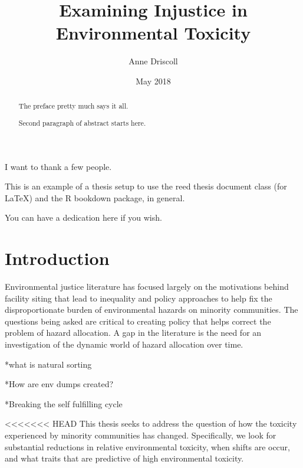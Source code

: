 \documentclass[12pt,twoside]{dukestatscithesis}
\title{Examining Injustice in Environmental Toxicity}
\author{Anne Driscoll}
\date{May 2018}
\theoremstyle{definition}
\theoremstyle{definition}
\theoremstyle{definition}
\theoremstyle{remark}
\begin{document}
  \maketitle

\frontmatter %
\pagestyle{empty} %
  \begin{acknowledgements}
    I want to thank a few people.
  \end{acknowledgements}
  \begin{preface}
    This is an example of a thesis setup to use the reed thesis document
    class (for LaTeX) and the R bookdown package, in general.
  \end{preface}
  \hypersetup{linkcolor=black}
  \setcounter{tocdepth}{2}
  \tableofcontents

  \listoftables

  \listoffigures
  \begin{abstract}
    The preface pretty much says it all. \par
    
    Second paragraph of abstract starts here.
  \end{abstract}
  \begin{dedication}
    You can have a dedication here if you wish.
  \end{dedication}
\mainmatter %
\pagestyle{fancyplain} %

\chapter*{Introduction}\label{introduction}

Environmental justice literature has focused largely on the motivations
behind facility siting that lead to inequality and policy approaches to
help fix the disproportionate burden of environmental hazards on
minority communities. The questions being asked are critical to creating
policy that helps correct the problem of hazard allocation. A gap in the
literature is the need for an investigation of the dynamic world of
hazard allocation over time.

*what is natural sorting

*How are env dumps created?

*Breaking the self fulfilling cycle

\textless{}\textless{}\textless{}\textless{}\textless{}\textless{}\textless{}
HEAD This thesis seeks to address the question of how the toxicity
experienced by minority communities has changed. Specifically, we look
for substantial reductions in relative environmental toxicity, when
shifts are occur, and what traits that are predictive of high
environmental toxicity.
\end{document}
